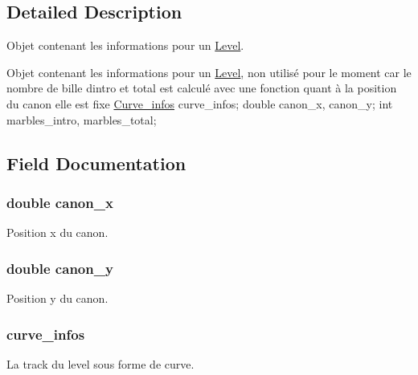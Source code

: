 \subsection{Detailed Description}
Objet contenant les informations pour un \hyperlink{struct_level}{Level}. 

Objet contenant les informations pour un \hyperlink{struct_level}{Level}, non utilisé pour le moment car le nombre de bille d\textquotesingle{}intro et total est calculé avec une fonction quant à la position du canon elle est fixe \hyperlink{struct_curve__infos}{Curve\+\_\+infos} curve\+\_\+infos; double canon\+\_\+x, canon\+\_\+y; int marbles\+\_\+intro, marbles\+\_\+total; 

\subsection{Field Documentation}
\subsubsection[{\texorpdfstring{canon\+\_\+x}{canon_x}}]{\setlength{\rightskip}{0pt plus 5cm}double canon\+\_\+x}\hypertarget{struct_level_a8d69c9e5161432eba15b8c66a3d822dc}{}\label{struct_level_a8d69c9e5161432eba15b8c66a3d822dc}
Position x du canon. 
\subsubsection[{\texorpdfstring{canon\+\_\+y}{canon_y}}]{\setlength{\rightskip}{0pt plus 5cm}double canon\+\_\+y}\hypertarget{struct_level_ae539e37b2953880bd182e39068838d1a}{}\label{struct_level_ae539e37b2953880bd182e39068838d1a}
Position y du canon. 
\subsubsection[{\texorpdfstring{curve\+\_\+infos}{curve_infos}}]{ curve\+\_\+infos}\hypertarget{struct_level_a917c9ea829deeac9d6a1c2309f76595b}{}\label{struct_level_a917c9ea829deeac9d6a1c2309f76595b}
La track du level sous forme de curve. 
